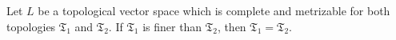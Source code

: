 Let $L$ be a topological vector space which is complete and metrizable for both topologies $\mathfrak{T}_1$ and $\mathfrak{T}_2$. If $\mathfrak{T}_1$ is finer than $\mathfrak{T}_2$, then $\mathfrak{T}_1 = \mathfrak{T}_2$.
